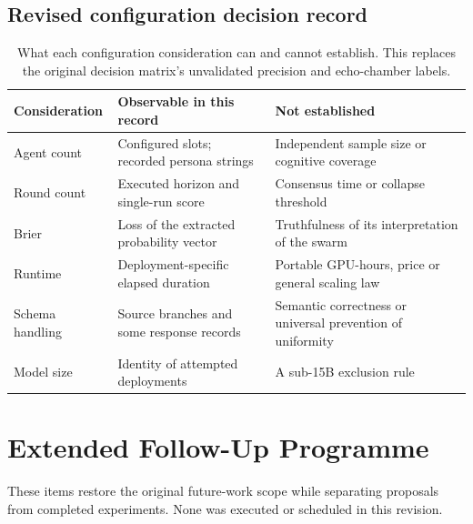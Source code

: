 \subsection{Revised configuration decision record}
\begin{table}[!htbp]
\centering\small
\caption{What each configuration consideration can and cannot establish. This replaces the original decision matrix's unvalidated precision and echo-chamber labels.}
\begin{tabular}{p{}p{}p{}}
\toprule
Consideration & Observable in this record & Not established\\
\midrule
Agent count & Configured slots; recorded persona strings & Independent sample size or cognitive coverage\\
Round count & Executed horizon and single-run score & Consensus time or collapse threshold\\
Brier & Loss of the extracted probability vector & Truthfulness of its interpretation of the swarm\\
Runtime & Deployment-specific elapsed duration & Portable GPU-hours, price or general scaling law\\
Schema handling & Source branches and some response records & Semantic correctness or universal prevention of uniformity\\
Model size & Identity of attempted deployments & A sub-15B exclusion rule\\
\bottomrule
\end{tabular}
\end{table}

\section{Extended Follow-Up Programme}
\label{sec:extended_future_work}
These items restore the original future-work scope while separating proposals from completed experiments. None was executed or scheduled in this revision.

